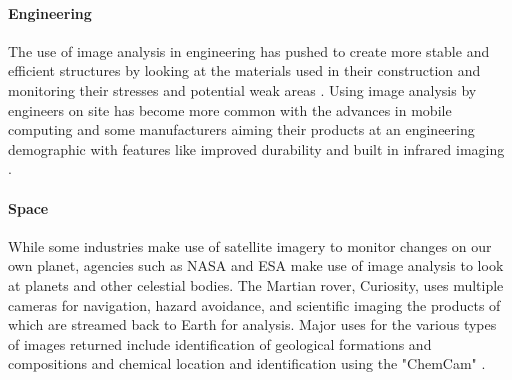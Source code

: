 	\paragraph{Engineering}
	The use of image analysis in engineering has pushed to create more stable and efficient structures by looking at the materials used in their construction \citep{concreteanalysis} and monitoring their stresses and potential weak areas \citep{bridgecables}. Using image analysis by engineers on site has become more common with the advances in mobile computing and some manufacturers aiming their products at an engineering demographic with features like improved durability and built in infrared imaging \citep{catphone}.
	\paragraph{Space}
	While some industries make use of satellite imagery to monitor changes on our own planet, agencies such as NASA and ESA make use of image analysis to look at planets and other celestial bodies. The Martian rover, Curiosity, uses multiple cameras for navigation, hazard avoidance, and scientific imaging the products of which are streamed back to Earth for analysis. Major uses for the various types of images returned include identification of geological formations and compositions \citep{curiositysand, curiositygravel} and chemical location and identification using the "ChemCam" \citep{curiosityhydrogen}.